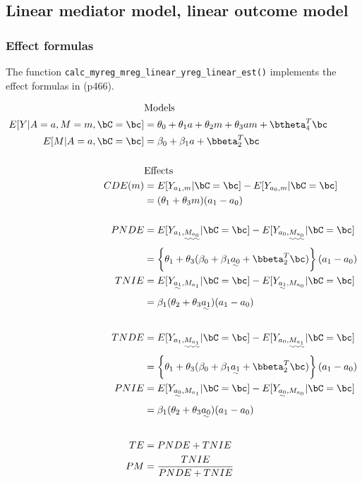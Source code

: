 \documentclass[dvipdfmx,10pt]{article}
\begin{document}
\subsection{Linear mediator model, linear outcome model}
\label{sec:orgbff21a1}
\subsubsection{Effect formulas}
\label{sec:org5befc45}
The function \texttt{calc\_myreg\_mreg\_linear\_yreg\_linear\_est()} implements the effect formulas in \cite{vanderweeleExplanationCausalInference2015} (p466).

\begin{align*}
  &\text{Models}\\
  E[Y|A=a,M=m,\bC=\bc] &= \theta_{0} + \theta_{1}a + \theta_{2}m + \theta_{3}am + \btheta_{4}^{T}\bc\\
  E[M|A=a,\bC=\bc] &= \beta_{0} + \beta_{1}a + \bbeta_{2}^{T}\bc\\
  \\
  &\text{Effects}\\
  CDE(m) &= E[Y_{a_{1},m} | \bC = \bc] - E[Y_{a_{0},m} | \bC = \bc]\\
  &= (\theta_{1} + \theta_{3}m)(a_{1} - a_{0})\\
  \\
  PNDE &= E[Y_{a_{1},\uwave{M_{a_{0}}}} | \bC = \bc] - E[Y_{a_{0},\uwave{M_{a_{0}}}} | \bC = \bc]\\
  &= \left\{ \theta_{1} + \theta_{3}(\beta_{0} + \beta_{1}\uwave{a_{0}} + \bbeta_{2}^{T}\bc) \right\} (a_{1} - a_{0})\\
  TNIE &= E[Y_{\uwave{a_{1}},M_{a_{1}}} | \bC = \bc] - E[Y_{\uwave{a_{1}},M_{a_{0}}} | \bC = \bc]\\
  &= \beta_{1}(\theta_{2} + \theta_{3}\uwave{a_{1}})(a_{1} - a_{0})\\
  \\
  TNDE &= E[Y_{a_{1},\uwave{M_{a_{1}}}} | \bC = \bc] - E[Y_{a_{0},\uwave{M_{a_{1}}}} | \bC = \bc]\\
  &= \left\{ \theta_{1} + \theta_{3}(\beta_{0} + \beta_{1}\uwave{a_{1}} + \bbeta_{2}^{T}\bc) \right\} (a_{1} - a_{0})\\
  PNIE &= E[Y_{\uwave{a_{0}},M_{a_{1}}} | \bC = \bc] - E[Y_{\uwave{a_{0}},M_{a_{0}}} | \bC = \bc]\\
  &= \beta_{1}(\theta_{2} + \theta_{3}\uwave{a_{0}})(a_{1} - a_{0})\\
  \\
  TE &= PNDE + TNIE\\
  PM &= \frac{TNIE}{PNDE + TNIE}\\
\end{align*}
\end{document}
